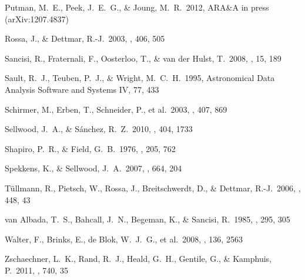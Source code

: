 \documentclass[traditabstract]{aa}
\begin{document}
\begin{thebibliography}{}
 Putman, M.~E., Peek, 
J.~E.~G., \& Joung, M.~R.\ 2012, ARA\&A in press (arXiv:1207.4837)

 Rossa, J., \& Dettmar, R.-J.\ 2003, \aap, 406, 505 

 Sancisi, R., Fraternali, F., Oosterloo, T., \& van der Hulst, T.\ 2008, \aapr, 15, 189 

 Sault, R.~J., Teuben, P.~J., 
\& Wright, M.~C.~H.\ 1995, Astronomical Data Analysis Software and Systems IV, 77, 433 

 Schirmer, M., Erben, T., Schneider, P., et al.\ 2003, \aap, 407, 869 

 Sellwood, J.~A., \&
S{\'a}nchez, R.~Z.\ 2010, \mnras, 404, 1733 

 Shapiro, P.~R., \& Field, G.~B.\ 1976, \apj, 205, 762 

 Spekkens, K., \& Sellwood, J.~A.\ 2007, \apj, 664, 204 

 T{\"u}llmann, R., Pietsch, W., Rossa, J., Breitschwerdt, D., \& Dettmar, R.-J.\ 2006, \aap, 448, 43 

 van Albada, T.~S., 
Bahcall, J.~N., Begeman, K., \& Sancisi, R.\ 1985, \apj, 295, 305 

 Walter, F., Brinks, E., 
de Blok, W.~J.~G., et al.\ 2008, \aj, 136, 2563 

 Zschaechner, L.~K., 
Rand, R.~J., Heald, G.~H., Gentile, G., 
\& Kamphuis, P.\ 2011, \apj, 740, 35 







\end{thebibliography}
\end{document}
